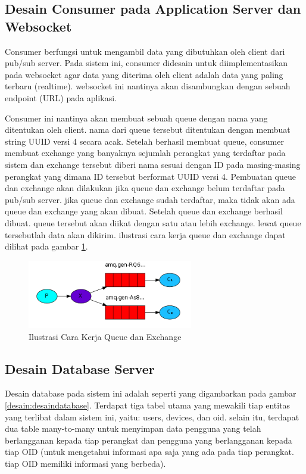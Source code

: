 		\subsection{Desain Consumer pada Application Server dan Websocket}
			Consumer berfungsi untuk mengambil data yang dibutuhkan oleh client dari pub/sub server. Pada sistem ini, consumer didesain untuk diimplementasikan pada websocket agar data yang diterima oleh client adalah data yang paling terbaru (realtime). websocket ini nantinya akan disambungkan dengan sebuah endpoint (URL) pada aplikasi.
			
			Consumer ini nantinya akan membuat sebuah queue dengan nama yang ditentukan oleh client. nama dari queue tersebut ditentukan dengan membuat string UUID versi 4 secara acak. Setelah berhasil membuat queue, consumer membuat exchange yang banyaknya sejumlah perangkat yang terdaftar pada sistem dan exchange tersebut diberi nama sesuai dengan ID pada masing-masing perangkat yang dimana ID tersebut berformat UUID versi 4. Pembuatan queue dan exchange akan dilakukan jika queue dan exchange belum terdaftar pada pub/sub server. jika queue dan exchange sudah terdaftar, maka tidak akan ada queue dan exchange yang akan dibuat. Setelah queue dan exchange berhasil dibuat. queue tersebut akan diikat dengan satu atau lebih exchange. lewat queue tersebutlah data akan dikirim. ilustrasi cara kerja queue dan exchange dapat dilihat pada gambar \ref{desain:consumer}.
			\begin{figure}[H]
				\centering
				\includegraphics[height=3cm]{Images/C-3/pubsubillus.png}
				\caption{Ilustrasi Cara Kerja Queue dan Exchange}
				\label{desain:consumer}
			\end{figure}

        \subsection{Desain Database Server}        	
        	Desain database pada sistem ini adalah seperti yang digambarkan pada gambar \ref{desain:desaindatabase}. Terdapat tiga tabel utama yang mewakili tiap entitas yang terlibat dalam sistem ini, yaitu: users, devices, dan oid. selain itu, terdapat dua table many-to-many untuk menyimpan data pengguna yang telah berlangganan kepada tiap perangkat dan pengguna yang berlangganan kepada tiap OID (untuk mengetahui informasi apa saja yang ada pada tiap perangkat. tiap OID memiliki informasi yang berbeda).
        	
